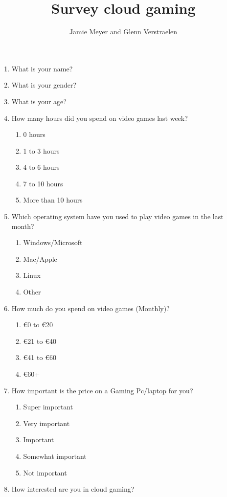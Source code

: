 \documentclass[]{report}
\title{Survey cloud gaming}
\author{Jamie Meyer and Glenn Verstraelen}
\begin{document}
	\maketitle
	\pagebreak
	
	
	\begin{enumerate}
		\item What is your name?
		\item What is your gender?
		\item What is your age?
		\item How many hours did you spend on video games last week?
		\begin{enumerate}
			\item 0 hours
			\item 1 to 3 hours
			\item 4 to 6 hours
			\item 7 to 10 hours
			\item More than 10 hours
		\end{enumerate}
		\item Which operating system have you used to play video games in the last month?
		\begin{enumerate}
			\item Windows/Microsoft\item Mac/Apple
			\item Linux
			\item Other
		\end{enumerate}
		\item How much do you spend on video games (Monthly)?
		\begin{enumerate}
			\item €0 to €20
			\item €21 to €40
			\item €41 to €60
			\item €60+
		\end{enumerate}
		\item How important is the price on a Gaming Pc/laptop for you?
		\begin{enumerate}
			\item Super important
			\item Very important
			\item Important
			\item Somewhat important
			\item Not important
		\end{enumerate}
		\item How interested are you in cloud gaming?
		\begin{enumerate}

\end{enumerate}
\end{enumerate}
\end{document}
